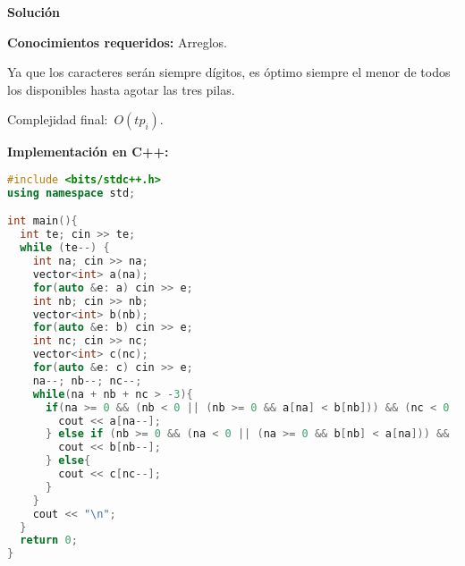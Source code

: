 \vspace*{0cm}
{\Large\textbf{Solución}}

\textbf{Conocimientos requeridos:} Arreglos.

Ya que los caracteres serán siempre dígitos, es óptimo siempre el menor de todos los
disponibles hasta agotar las tres pilas.

Complejidad final:~$O(tp_i)$.

\textbf{Implementación en C++:}

\begin{lstlisting}[language=C++]
#include <bits/stdc++.h>
using namespace std;

int main(){
  int te; cin >> te;
  while (te--) {
    int na; cin >> na;
    vector<int> a(na);
    for(auto &e: a) cin >> e;
    int nb; cin >> nb;
    vector<int> b(nb);
    for(auto &e: b) cin >> e;
    int nc; cin >> nc;
    vector<int> c(nc);
    for(auto &e: c) cin >> e;
    na--; nb--; nc--;
    while(na + nb + nc > -3){
      if(na >= 0 && (nb < 0 || (nb >= 0 && a[na] < b[nb])) && (nc < 0 || (nc >= 0 && a[na] < c[nc]))){
        cout << a[na--];
      } else if (nb >= 0 && (na < 0 || (na >= 0 && b[nb] < a[na])) && (nc < 0 || (nc >= 0 && b[nb] < c[nc]))) {
        cout << b[nb--];
      } else{
        cout << c[nc--];
      }
    }
    cout << "\n";
  }
  return 0;
}
\end{lstlisting}

\newpage

